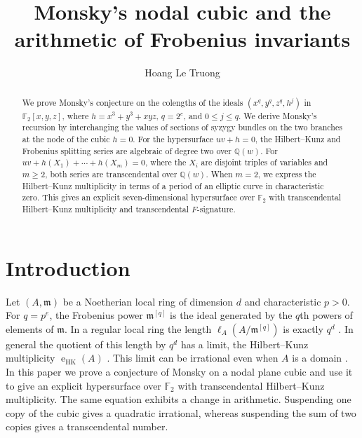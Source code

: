 \documentclass[11pt,a4paper,reqno]{amsart}
\title[Monsky's nodal cubic and Frobenius invariants]{Monsky's nodal cubic and the arithmetic of Frobenius invariants}
\author[H.L.Truong]{Hoang Le Truong}
\date{}
\numberwithin{equation}{section}
\theoremstyle{plain}
\newcommand{\m}{\mathfrak m}
\newcommand{\eHK}{\operatorname{e}_{\mathrm{HK}}}
\begin{document}
\begin{abstract}
We prove Monsky's conjecture on the colengths of the ideals
\((x^q,y^q,z^q,h^j)\) in \(\mathbb{F}_2[x,y,z]\), where
\(h=x^3+y^3+xyz\), \(q=2^e\), and \(0\le j\le q\).
We derive Monsky's recursion by interchanging the values of sections
of syzygy bundles on the two branches at the node of the cubic \(h=0\).
For the hypersurface \(uv+h=0\), the Hilbert--Kunz and Frobenius
splitting series are algebraic of degree two over \(\mathbb{Q}(w)\).
For \(uv+h(X_1)+\cdots+h(X_m)=0\), where the \(X_i\) are disjoint
triples of variables and \(m\ge 2\), both series are transcendental
over \(\mathbb{Q}(w)\). When \(m=2\), we express the Hilbert--Kunz
multiplicity in terms of a period of an elliptic curve in
characteristic zero. This gives an explicit seven-dimensional
hypersurface over \(\mathbb{F}_2\) with transcendental Hilbert--Kunz
multiplicity and transcendental \(F\)-signature.
\end{abstract}
\maketitle

\section{Introduction}

Let $(A,\m)$ be a Noetherian local ring of dimension $d$ and characteristic $p>0$. For $q=p^e$, the Frobenius power $\m^{[q]}$ is the ideal generated by the $q$th powers of elements of $\m$. In a regular local ring the length $\ell_A(A/\m^{[q]})$ is exactly $q^d$ \cite{Kunz}. In general the quotient of this length by $q^d$ has a limit, the Hilbert--Kunz multiplicity $\eHK(A)$ \cite{Mon83}. This limit can be irrational even when $A$ is a domain \cite{Bren13}. In this paper we prove a conjecture of Monsky on a nodal plane cubic and use it to give an explicit hypersurface over $\mathbb F_2$ with transcendental Hilbert--Kunz multiplicity. The same equation exhibits a change in arithmetic. Suspending one copy of the cubic gives a quadratic irrational, whereas suspending the sum of two copies gives a transcendental number.
\end{document}
